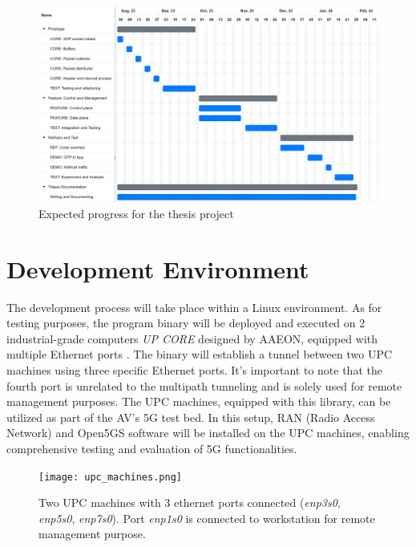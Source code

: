 \clearpage
\begin{figure}
    \centering
    \includegraphics[width=1.0\textwidth]{resources/images/TIMELINE.PNG}
    \caption{Expected progress for the thesis project}
	\label{fig:plan:TIMELINE}
  \end{figure}

\clearpage
\section{Development Environment}
The development process will take place within a Linux environment. 
As for testing purposes, the program binary will be deployed and executed on 2 industrial-grade computers \textit{UP CORE} designed by \ac{AAEON}, equipped with multiple Ethernet ports \cite{upc_core} \cite{upc_extension_board}. 
The binary will establish a tunnel between two UPC machines using three specific Ethernet ports. 
It's important to note that the fourth port is unrelated to the multipath tunneling and is solely used for remote management purposes.
The UPC machines, equipped with this library, can be utilized as part of the AV's 5G test bed. 
In this setup, RAN (Radio Access Network) and Open5GS software will be installed on the UPC machines, enabling comprehensive testing and evaluation of 5G functionalities.

\begin{figure}[H]
	\centering
	\texttt{[image: upc\_machines.png]}
	\caption{Two UPC machines with 3 ethernet ports connected (\textit{enp3s0}, \textit{enp5s0}, \textit{enp7s0}). Port \textit{enp1s0} is connected to workstation for remote management purpose.}
	\label{fig:plan:upc_machines}
\end{figure}
